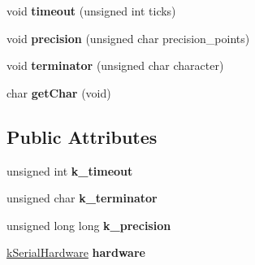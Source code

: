 \begin{DoxyCompactItemize}
\item 
void {\bfseries timeout} (unsigned int ticks)\hypertarget{classkSerial_ac1d27ad865bd26d73b888adf8e989848}{}\label{classkSerial_ac1d27ad865bd26d73b888adf8e989848}

\item 
void {\bfseries precision} (unsigned char precision\+\_\+points)\hypertarget{classkSerial_aa2e89457fcc10f6cd7300e68f8d7db25}{}\label{classkSerial_aa2e89457fcc10f6cd7300e68f8d7db25}

\item 
void {\bfseries terminator} (unsigned char character)\hypertarget{classkSerial_aa39e149e6c575bddecc46a85f7105311}{}\label{classkSerial_aa39e149e6c575bddecc46a85f7105311}

\item 
char {\bfseries get\+Char} (void)\hypertarget{classkSerial_a361a89288db217d9aa5a9c1aed13e106}{}\label{classkSerial_a361a89288db217d9aa5a9c1aed13e106}

\end{DoxyCompactItemize}
\subsection*{Public Attributes}
\begin{DoxyCompactItemize}
\item 
unsigned int {\bfseries k\+\_\+timeout}\hypertarget{classkSerial_a627ced93f5f71161a4582d7cfed0d2f4}{}\label{classkSerial_a627ced93f5f71161a4582d7cfed0d2f4}

\item 
unsigned char {\bfseries k\+\_\+terminator}\hypertarget{classkSerial_a228629fa7a6c053c81b4c33f3b38ad16}{}\label{classkSerial_a228629fa7a6c053c81b4c33f3b38ad16}

\item 
unsigned long long {\bfseries k\+\_\+precision}\hypertarget{classkSerial_a20cdaa78b379aab6dab5395d76c3beb8}{}\label{classkSerial_a20cdaa78b379aab6dab5395d76c3beb8}

\item 
\hyperlink{classkSerialHardware}{k\+Serial\+Hardware} {\bfseries hardware}\hypertarget{classkSerial_a7578eac2196872387aa07482326e0f64}{}\label{classkSerial_a7578eac2196872387aa07482326e0f64}

\end{DoxyCompactItemize}
